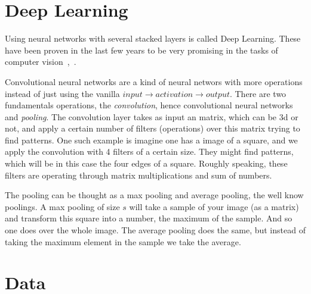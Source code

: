 \documentclass{article}
\begin{document}
\section{Deep Learning}
  Using neural networks with several stacked layers is called Deep Learning.
  These have been proven in the last few years to be very promising in the
  tasks of computer vision~\cite{ImageNet},~\cite{places}.

  Convolutional neural networks are a kind of neural
  networs with more operations instead of just using the vanilla
  $input\rightarrow activation \rightarrow output$. There are two fundamentals
  operations, the \emph{convolution}, hence convolutional neural networks and
  \emph{pooling}.
  The convolution layer takes as input an matrix, which can be 3d or not,
  and apply a certain number of filters (operations) over this matrix trying to
  find patterns. One such example is imagine one has a image of a square,
  and we apply the convolution with 4 filters of a certain size. They might
  find patterns, which will be in this case the four edges of a square.
  Roughly speaking, these filters are operating through matrix multiplications
  and sum of numbers.

  The pooling can be thought as a max pooling and average pooling, the well
  know poolings. A max pooling of size $s$ will take a sample of your image (as
  a matrix) and transform this square into a number, the maximum of the sample.
  And so one does over the whole image. The average pooling does the same, but
  instead of taking the maximum element in the sample we take the average.

\section{Data}
\end{document}
